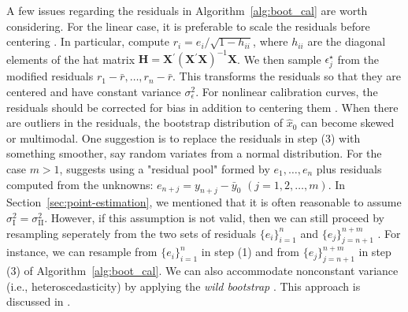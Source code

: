 \documentclass[cmfont,usenames,dvipsnames,leqno]{afit-etd}\usepackage[]{graphicx}\usepackage[]{color}
\newcommand{\boot}{\star} %
\newcommand{\trans}{\ensuremath{^\prime}}
\newcommand{\wh}[1]{\ensuremath{\widehat{#1}}}
\newcommand{\X}{\ensuremath{\bm{X}}}
\begin{document}
A few issues regarding the residuals in Algorithm~\ref{alg:boot_cal} are worth considering. For the linear case, it is preferable to scale the residuals before centering \citep{davison_bootstrap_1997}. In particular, compute $r_i = e_i/\sqrt{1-h_{ii}}$, where $h_{ii}$ are the diagonal elements of the hat matrix $\bm{H} = \X\trans(\X\trans\X)^{-1}\X$. We then sample $\epsilon_j^\boot$ from the modified residuals $r_1 - \bar{r}, \dotsc, r_n - \bar{r}$. This transforms the residuals so that they are centered and have constant variance $\sigma_\epsilon^2$. For nonlinear calibration curves, the residuals should be corrected for bias in addition to centering them \citep{davison_bootstrap_1997}. When there are outliers in the residuals, the bootstrap distribution of $\wh{x}_0$ can become skewed or multimodal. One suggestion is to replace the residuals in step (3) with something smoother, say random variates from a normal distribution. For the case $m > 1$, \citet{jones_bootstrapping_1999} suggests using a "residual pool" formed by $e_1, \dotsc, e_n$ plus residuals computed from the unknowns: $e_{n+j} = y_{n+j} - \bar{y}_0$ $(j = 1, 2, \dotsc, m)$. In Section~\ref{sec:point-estimation}, we mentioned that it is often reasonable to assume $\sigma_{\text{I}}^2 = \sigma_{\text{II}}^2$. However, if this assumption is not valid, then we can still proceed by resampling seperately from the two sets of residuals $\big\{e_i\big\}_{i = 1}^n$ and $\big\{e_j\big\}_{j = n + 1}^{n + m}$ \citep{gruet_calibration_1993, jones_bootstrapping_1999}. For instance, we can resample from $\big\{e_i\big\}_{i = 1}^n$ in step (1) and from $\big\{e_j\big\}_{j = n + 1}^{n + m}$ in step (3) of Algorithm~\ref{alg:boot_cal}. We can also accommodate nonconstant variance (i.e., heteroscedasticity) by applying the \textit{wild bootstrap} \citep[pp. 272]{davison_bootstrap_1997}. This approach is discussed in \citet[pp. 142]{huet_statistical_2004}.
\end{document}
